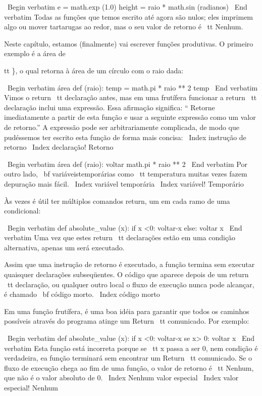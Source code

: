 \documentclass[10pt]{book}
\begin{document}
\begin {itemize}
{{{\ Begin {verbatim}
e = math.exp (1.0)
height = raio * math.sin (radianos)
\ End {verbatim}
%
Todas as funções que temos escrito até agora são nulos; eles imprimem
algo ou mover tartarugas ao redor, mas o seu valor de retorno é {\ tt
Nenhum}.

Neste capítulo, estamos (finalmente) vai escrever funções produtivas.
O primeiro exemplo é a área de {tt \}, o qual retorna à área de um círculo
com o raio dada:

\ Begin {verbatim}
área def (raio):
    temp = math.pi * raio ** 2
    temp
\ End {verbatim}
%
Vimos o {return \ tt} declaração antes, mas em uma frutífera
funcionar a {return \ tt} declaração inclui
uma expressão. Essa afirmação significa: `` Retorne imediatamente a partir de
esta função e usar a seguinte expressão como um valor de retorno.''
A expressão pode ser arbitrariamente complicada, de modo que pudéssemos
ter escrito esta função de forma mais concisa:
\ Index {instrução de retorno}
\ Index {declaração! Retorno}

\ Begin {verbatim}
área def (raio):
    voltar math.pi * raio ** 2
\ End {verbatim}
%
Por outro lado, {\ bf variáveis ​​temporárias} como {\ tt temperatura} muitas vezes fazem
depuração mais fácil.
\ Index {variável temporária}
\ Index {variável! Temporário}

Às vezes é útil ter múltiplos comandos return, um em cada
ramo de uma condicional:

\ Begin {verbatim}
def absolute_value (x):
    if x <0:
        voltar-x
    else:
        voltar x
\ End {verbatim}
%
Uma vez que estes {return \ tt} declarações estão em uma condição alternativa,
apenas um será executado.

Assim que uma instrução de retorno é executado, a função
termina sem executar quaisquer declarações subseqüentes.
O código que aparece depois de um {return \ tt} declaração, ou qualquer outro local
o fluxo de execução nunca pode alcançar, é chamado {\ bf código morto}.
\ Index {código morto}

Em uma função frutífera, é uma boa idéia para garantir
que todos os caminhos possíveis através do programa atinge um
{Return \ tt} comunicado. Por exemplo:

\ Begin {verbatim}
def absolute_value (x):
    if x <0:
        voltar-x
    se x> 0:
        voltar x
\ End {verbatim}
%
Esta função está incorreta porque se {\ tt x} passa a ser 0,
nem condição é verdadeira, ea função terminará sem encontrar um
{Return \ tt} comunicado. Se o fluxo de execução chega ao fim
de uma função, o valor de retorno é {\ tt Nenhum}, que não é
o valor absoluto de 0.
\ Index {Nenhum valor especial}
\ Index {valor especial! Nenhum}

}}}}
\end{itemize}
\end{document}

